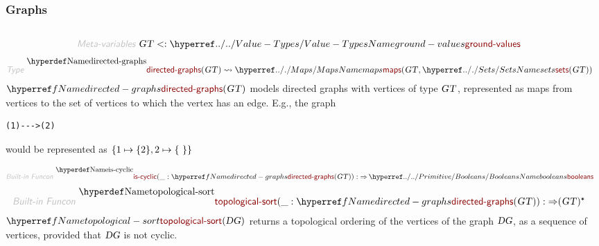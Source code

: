 \subsubsection*{Graphs}\hypertarget{graphs}{}\label{graphs}

\begin{align*}
  [ ~ 
  \KEY{Type} ~ & \NAMEREF{directed-graphs} \\
  \KEY{Funcon} ~ & \NAMEREF{is-cyclic} \\
  \KEY{Funcon} ~ & \NAMEREF{topological-sort}
  ~ ]
\end{align*}
\begin{align*}
  \KEY{Meta-variables} ~ 
  & \VAR{GT} <: \NAMEHYPER{../..}{Value-Types}{ground-values}
\end{align*}
\begin{align*}
  \KEY{Type} ~  
  & \NAMEDECL{directed-graphs}(\VAR{GT} )  
  \leadsto \NAMEHYPER{../.}{Maps}{maps}
             ( \VAR{GT},      
               \NAMEHYPER{../.}{Sets}{sets}
                 ( \VAR{GT} ) )
\end{align*}
$\SHADE{\NAMEREF{directed-graphs}
           ( \VAR{GT} )}$ models directed graphs with vertices of type $\SHADE{\VAR{GT}}$,
  represented as maps from vertices to the set of vertices to which the
  vertex has an edge.  E.g., the graph

\begin{verbatim}(1)--->(2)
\end{verbatim}

would be represented as $\strut\{ 1 \mapsto 
              \{ 2 \}, 2 \mapsto 
              \{  ~  \} \}\strut$

\begin{align*}
  \KEY{Built-in Funcon} ~ 
  & \NAMEDECL{is-cyclic}(\_ : \NAMEREF{directed-graphs}
                                ( \VAR{GT} )) :  \TO \NAMEHYPER{../../Primitive}{Booleans}{booleans}
\end{align*}
\begin{align*}
  \KEY{Built-in Funcon} ~ 
  & \NAMEDECL{topological-sort}(\_ : \NAMEREF{directed-graphs}
                                ( \VAR{GT} )) :  \TO ( \VAR{GT} )\STAR
\end{align*}
$\SHADE{\NAMEREF{topological-sort}
           ( \VAR{DG} )}$ returns a topological ordering of the vertices
  of the graph $\SHADE{\VAR{DG}}$, as a sequence of vertices, provided that $\SHADE{\VAR{DG}}$ is not
  cyclic.

